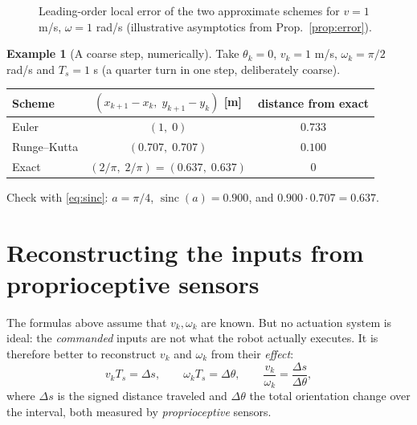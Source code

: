 \documentclass[11pt,a4paper]{article}
\newcommand{\Ts}{T_s}
\DeclareMathOperator{\sinc}{sinc}
\newcommand{\slides}[1]{\texorpdfstring{\hspace{0.5em}{\normalfont\small\emph{(#1)}}}{}}
\theoremstyle{plain}
\theoremstyle{definition}
\newtheorem{example}[theorem]{Example}
\theoremstyle{remark}
\begin{document}
\begin{figure}[H]
\centering
{}
\caption{Leading-order local error of the two approximate schemes for $v=1$ m/s, $\omega=1$ rad/s
(illustrative asymptotics from Prop.~\ref{prop:error}).}\label{fig:rates}
\end{figure}

\begin{example}[A coarse step, numerically]
Take $\theta_k=0$, $v_k=1$ m/s, $\omega_k=\pi/2$ rad/s and $\Ts=1$ s (a quarter turn in one step, deliberately coarse).
\begin{center}
\begin{tabular}{lcc}
\toprule
Scheme & $(x_{k+1}-x_k,\;y_{k+1}-y_k)$ [m] & distance from exact\\
\midrule
Euler & $(1,\;0)$ & $0.733$\\
Runge--Kutta & $(0.707,\;0.707)$ & $0.100$\\
Exact & $(2/\pi,\;2/\pi)=(0.637,\;0.637)$ & $0$\\
\bottomrule
\end{tabular}
\end{center}
Check with \eqref{eq:sinc}: $a=\pi/4$, $\sinc(a)=0.900$, and $0.900\cdot0.707=0.637$.
\end{example}

\section{Reconstructing the inputs from proprioceptive sensors \slides{odometry deck, slide 7}}

The formulas above assume that $v_k,\omega_k$ are known. But no actuation system is ideal: the
\emph{commanded} inputs are not what the robot actually executes. It is therefore better to
reconstruct $v_k$ and $\omega_k$ from their \emph{effect}:
\begin{equation}\label{eq:ds}
v_k\Ts=\Delta s,\qquad \omega_k\Ts=\Delta\theta,\qquad \frac{v_k}{\omega_k}=\frac{\Delta s}{\Delta\theta},
\end{equation}
where $\Delta s$ is the signed distance traveled and $\Delta\theta$ the total orientation change over the
interval, both measured by \emph{proprioceptive} sensors.
\end{document}
